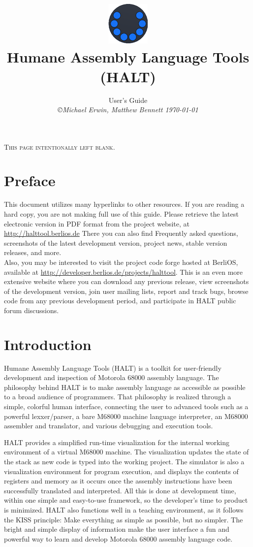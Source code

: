 \documentclass[10pt,fullpage]{article}
\title{\includegraphics[scale=0.5]{logo1.png}\\Humane Assembly Language Tools (HALT)}
\author{User's Guide \\
{\small\em \copyright Michael Erwin, Matthew Bennett \today }}
\date{ }
\begin{document}
\maketitle
\tableofcontents
\newpage
\begin{center}
\textsc{This page intentionally left blank.} \end{center}
\newpage
\section*{Preface}
This document utilizes many hyperlinks to other resources. If you
are reading a hard copy, you are not making full use of this guide.
Please retrieve the latest electronic version in PDF format from the
project website, at
\href{http://halttool.berlios.de}{http://halttool.berlios.de} There
you can also find Frequently asked questions, screenshots of the
latest development version, project news, stable version releases,
and more.\\
Also, you may be interested to visit the project code forge hosted
at BerliOS, available at
\href{http://developer.berlios.de/projects/halttool}{http://developer.berlios.de/projects/halttool}.
This is an even more extensive website where you can download any
previous release, view screenshots of the development version, join
user mailing lists, report and track bugs, browse code from any
previous development period, and participate in HALT public forum discussions.\\

\section*{Introduction}

Humane Assembly Language Tools (HALT) is a toolkit for user-friendly
development and inspection of Motorola 68000 assembly language. The
philosophy behind HALT is to make assembly language as accessible as
possible to a broad audience of programmers. That philosophy is
realized through a simple, colorful human interface, connecting the
user to advanced tools such as a powerful lexxer/parser, a bare
M68000 machine language interpreter, an M68000 assembler and
translator, and various debugging and execution tools.

HALT provides a simplified run-time visualization for the internal
working environment of a virtual M68000 machine. The visualization
updates the state of the stack as new code is typed into the working
project. The simulator is also a visualization environment for
program execution, and displays the contents of registers and memory
as it occurs once the assembly instructions have been successfully
translated and interpreted. All this is done at development time,
within one simple and easy-to-use framework, so the developer's time
to product is minimized. HALT also functions well in a teaching
environment, as it follows the KISS principle: Make everything as
simple as possible, but no simpler. The bright and simple display of
information make the user interface a fun and powerful way to learn
and develop Motorola 68000 assembly language code.
\end{document}
